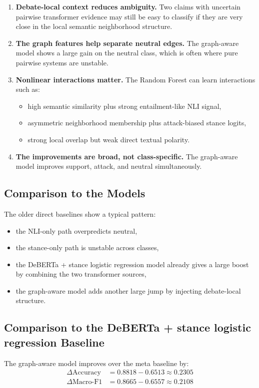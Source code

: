 \documentclass[11pt,a4paper]{article}
\begin{document}
\begin{enumerate}[label=\arabic*.]
  \item \textbf{Debate-local context reduces ambiguity.} Two claims with uncertain pairwise transformer evidence may still be easy to classify if they are very close in the local semantic neighborhood structure.
  \item \textbf{The graph features help separate neutral edges.} The graph-aware model shows a large gain on the neutral class, which is often where pure pairwise systems are unstable.
  \item \textbf{Nonlinear interactions matter.} The Random Forest can learn interactions such as:
  \begin{itemize}[leftmargin=1.5em]
    \item high semantic similarity plus strong entailment-like NLI signal,
    \item asymmetric neighborhood membership plus attack-biased stance logits,
    \item strong local overlap but weak direct textual polarity.
  \end{itemize}
  \item \textbf{The improvements are broad, not class-specific.} The graph-aware model improves support, attack, and neutral simultaneously.
\end{enumerate}

\subsection{Comparison to the  Models}
The older direct baselines show a typical pattern:
\begin{itemize}[leftmargin=1.5em]
  \item the NLI-only path overpredicts neutral,
  \item the stance-only path is unstable across classes,
  \item the DeBERTa + stance logistic regression model already gives a large boost by combining the two transformer sources,
  \item the graph-aware model adds another large jump by injecting debate-local structure.
\end{itemize}

\subsection{Comparison to the DeBERTa + stance logistic regression Baseline}
The graph-aware model improves over the meta baseline by:
\begin{align*}
\Delta \text{Accuracy} &= 0.8818 - 0.6513 \approx 0.2305 \\
\Delta \text{Macro-F1} &= 0.8665 - 0.6557 \approx 0.2108
\end{align*}
\end{document}
